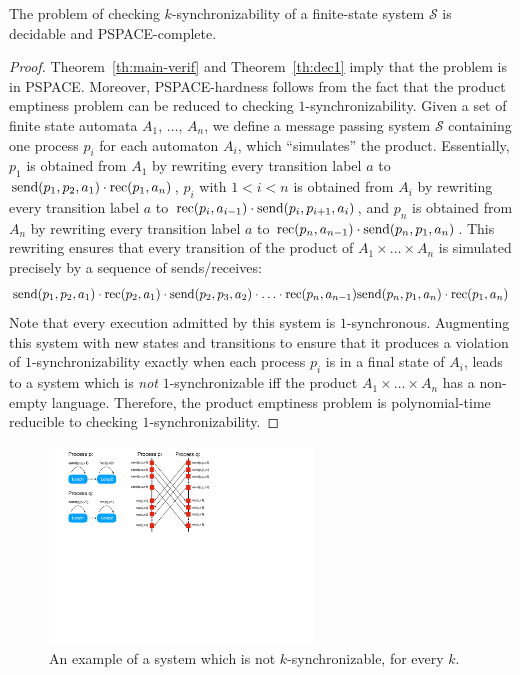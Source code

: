 \begin{theorem}
The problem of checking $k$-synchronizability of a finite-state system $\mathcal{S}$ is decidable and PSPACE-complete.
\end{theorem}
\begin{proof}
Theorem~\ref{th:main-verif} and Theorem~\ref{th:dec1} imply that the problem is in PSPACE. Moreover, PSPACE-hardness follows from the fact that the product emptiness problem can be reduced to checking $1$-synchronizability. Given a set of finite state automata $A_1$, $\ldots$, $A_n$, we define a message passing system $\mathcal{S}$ containing one process $p_i$ for each automaton $A_i$, which ``simulates'' the product. Essentially, $p_1$ is obtained from $A_1$ by rewriting every transition label $a$ to $\mathrm{send}({p_1,p_2,a_1})\cdot \mathrm{rec}({p_1,a_n})$, $p_i$ with $1<i<n$ is obtained from $A_i$ by rewriting every transition label $a$ to $\mathrm{rec}({p_i,a_{i-1}})\cdot \mathrm{send}({p_i,p_{i+1},a_i})$, and $p_n$ is obtained from $A_n$ by rewriting every transition label $a$ to $\mathrm{rec}({p_n,a_{n-1}})\cdot \mathrm{send}({p_n,p_1,a_n})$. This rewriting ensures that every transition of the product of $A_1\times\ldots\times A_n$ is simulated precisely by a sequence of sends/receives:
\begin{align*}
\mathrm{send}({p_1,p_2,a_1})\cdot \mathrm{rec}({p_2,a_1})\cdot \mathrm{send}({p_2,p_3,a_2})\cdot\ldots \cdot \mathrm{rec}({p_n,a_{n-1}}) \mathrm{send}({p_n,p_1,a_n})\cdot \mathrm{rec}({p_1,a_n})
\end{align*}
Note that every execution admitted by this system is $1$-synchronous. Augmenting this system with new states and transitions to ensure that it produces a violation of $1$-synchronizability exactly when each process $p_i$ is in a final state of $A_i$, leads to a system which is \emph{not} $1$-synchronizable iff the product $A_1\times\ldots\times A_n$ has a non-empty language. Therefore, the product emptiness problem is polynomial-time reducible to checking $1$-synchronizability.
\end{proof}

\begin{figure}
\includegraphics[width=7cm]{Ex-Decidability.pdf}
\caption{An example of a system which is not $k$-synchronizable, for every $k$.}
\label{fig:decid_ex}
\end{figure}

